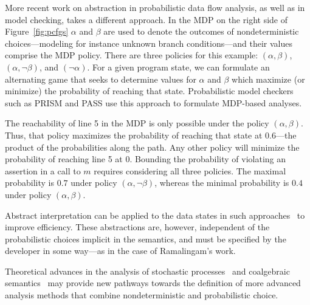 More recent work on abstraction in probabilistic data flow
analysis, as well as in model checking, takes a different approach.
In the MDP on the right side of Figure~\ref{fig:pcfgs} $\alpha$ and
$\beta$ are used to denote the outcomes of nondeterministic
choices---modeling for instance unknown branch conditions---and their
values comprise the MDP policy.
There are three policies for this example:
$(\alpha,\beta)$, $(\alpha,\neg \beta)$, and $(\neg \alpha)$.
For a given program state, we can formulate an alternating game
that seeks to determine values for $\alpha$ and $\beta$ which 
maximize (or minimize) the probability of reaching that state.
Probabilistic model checkers such as PRISM and PASS 
use this approach to formulate MDP-based analyses.

The reachability of line 5 in the MDP is only possible under
the policy $(\alpha, \beta)$.  Thus, that policy maximizes the
probability of reaching that state at $0.6$---the product of 
the probabilities along the path. 
Any other policy will minimize the probability of reaching
line 5 at $0$.
Bounding the probability of violating an assertion in a call to $m$ 
requires considering all three policies.  The
maximal probability is $0.7$ under policy $(\alpha, \neg \beta)$,
whereas the minimal probability is 
$0.4$ under policy $(\alpha, \beta)$.

Abstract interpretation can be applied to the data states in
such approaches~\cite{kwiatkowska2011prism,wachter2010best,esparza2011probabilistic}
to improve efficiency.  These abstractions are, however,
independent of the probabilistic choices implicit in the semantics, and must be specified
by the developer in some way---as in the case of Ramalingam's work.

Theoretical advances in the analysis of stochastic 
processes~\cite{Pugelli:CAV2013} and coalgebraic 
semantics~\cite{HASUO200647,Oliveira2016449}
may provide new pathways towards the definition of more advanced 
analysis methods that combine nondeterministic 
and probabilistic choice.

